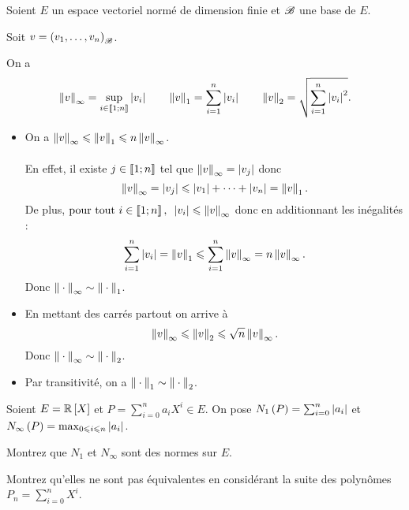 \begin{corr}
Soient \(E\) un espace vectoriel normé de dimension finie et \(\mathscr{B}\) une base de \(E\).

Soit \(v=\left(v_1,\dots,v_n\right)_{\mathscr{B}}\).

On a \[\norme{v}_\infty=\sup_{i\in\interventierii{1}{n}}\abs{v_i}\qquad\norme{v}_1=\sum_{i=1}^n\abs{v_i}\qquad\norme{v}_2=\sqrt{\sum_{i=1}^n\abs{v_i}^2}.\]

\begin{itemize}
    \item On a \(\norme{v}_\infty\leq\norme{v}_1\leq n\norme{v}_\infty\). \\\\ En effet, il existe \(j\in\left\llbracket1;n\right\rrbracket\) tel que \(\norme{v}_\infty=\abs{v_j}\) donc \[\norme{v}_\infty=\abs{v_j}\leq\abs{v_1}+\dots+\abs{v_n}=\norme{v}_1.\] De plus, \(\quantifs{\tpt i\in\interventierii{1}{n}}\abs{v_i}\leq\norme{v}_\infty\) donc en additionnant les inégalités : \[\sum_{i=1}^n\abs{v_i}=\norme{v}_1\leq\sum_{i=1}^n\norme{v}_\infty=n\norme{v}_\infty.\] Donc \(\norme{}_\infty\sim\norme{}_1\). \\
    \item En mettant des carrés partout on arrive à \[\norme{v}_\infty\leq\norme{v}_2\leq\sqrt{n}\norme{v}_\infty.\] Donc \(\norme{}_\infty\sim\norme{}_2\). \\
    \item Par transitivité, on a \(\norme{}_1\sim\norme{}_2\).
\end{itemize}
\end{corr}

\begin{exo}
Soient \(E=\poly[\R]\) et \(P=\sum_{i=0}^na_iX^i\in E\). On pose \(N_1\left(P\right)=\sum_{i=0}^n\left\lvert a_i\right\rvert\) et \(N_\infty\left(P\right)=\max_{0\leqslant i\leqslant n}\left\lvert a_i\right\rvert\).

Montrez que \(N_1\) et \(N_\infty\) sont des normes sur \(E\).

Montrez qu'elles ne sont pas équivalentes en considérant la suite des polynômes \(P_n=\sum_{i=0}^nX^i\).
\end{exo}

